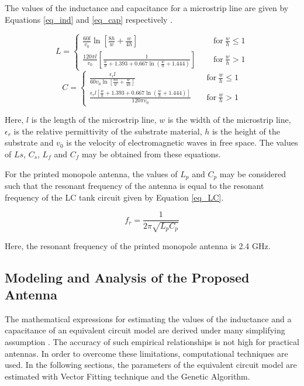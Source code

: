 The values of the inductance and capacitance for a microstrip line are given by Equations \ref{eq_ind} and \ref{eq_cap} respectively \cite{multi_conductor_analysis_book}.

\begin{equation}\label{eq_ind}
L=
    \begin{cases}
    \frac{60l}{v_0}\ln\left[\frac{8h}{w}+\frac{w}{4h}\right]~~~~~~&\text{for}~\frac{w}{h}\leq1 \\
    \frac{120\pi l}{v_0}\left[\frac{1}{\frac{w}{h}+1.393+0.667\ln \left(\frac{w}{h}+1.444\right)}\right]~~~~~~&\text{for}~\frac{w}{h}>1
    \end{cases}
\end{equation}
\begin{equation}\label{eq_cap}
C=
\begin{cases}
    \frac{\epsilon_r l}{60v_0\ln\left[\frac{8h}{w}+\frac{w}{4h}\right]}~~~~~&\text{for}~\frac{w}{h}\leq1 \\
    \frac{\epsilon_r l\left[\frac{w}{h}+1.393+0.667 \ln\left(\frac{w}{h}+1.444\right)\right]}{120\pi v_0}~~~~~&\text{for}~\frac{w}{h}>1
\end{cases}
\end{equation}

Here, $l$ is the length of the microstrip line, $w$ is the width of the microstrip line, $\epsilon_r$ is the relative permittivity of the substrate material, $h$ is the height of the substrate and $v_0$ is the velocity of electromagnetic waves in free space. The values of $Ls$, $C_s$, $L_f$ and $C_f$ may be obtained from these equations.

For the printed monopole antenna, the values of $L_p$ and $C_p$ may be considered such that the resonant frequency of the antenna is equal to the resonant frequency of the LC tank circuit given by Equation \ref{eq_LC}.

\begin{equation}\label{eq_LC}
f_r = \frac{1}{2\pi \sqrt{L_p C_p}}
\end{equation}

Here, the resonant frequency of the printed monopole antenna is 2.4 GHz.

\subsection{Modeling and Analysis of the Proposed Antenna}\label{c4sec:analysis}
The mathematical expressions for estimating the values of the inductance and a capacitance of an equivalent circuit model are derived under many simplifying assumption \cite{handbook}. The accuracy of such empirical relationships is not high for practical antennas. In order to overcome these limitations, computational techniques are used. In the following sections, the parameters of the equivalent circuit model are estimated with Vector Fitting technique and the Genetic Algorithm.

